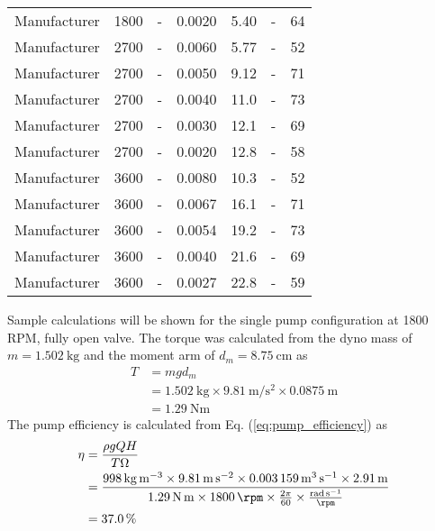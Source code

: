 \begin{longtable}{lC{0.10\textwidth}C{0.10\textwidth}C{0.10\textwidth}C{0.10\textwidth}C{0.10\textwidth}C{0.10\textwidth}}
    Manufacturer & 1800 & - & 0.0020 & 5.40 & - & 64 \\
    Manufacturer & 2700 & - & 0.0060 & 5.77 & - & 52 \\
    Manufacturer & 2700 & - & 0.0050 & 9.12 & - & 71 \\
    Manufacturer & 2700 & - & 0.0040 & 11.0 & - & 73 \\
    Manufacturer & 2700 & - & 0.0030 & 12.1 & - & 69 \\
    Manufacturer & 2700 & - & 0.0020 & 12.8 & - & 58 \\
    Manufacturer & 3600 & - & 0.0080 & 10.3 & - & 52 \\
    Manufacturer & 3600 & - & 0.0067 & 16.1 & - & 71 \\
    Manufacturer & 3600 & - & 0.0054 & 19.2 & - & 73 \\
    Manufacturer & 3600 & - & 0.0040 & 21.6 & - & 69 \\
    Manufacturer & 3600 & - & 0.0027 & 22.8 & - & 59 \\
    \bottomrule
\end{longtable}
\noindent Sample calculations will be shown for the single pump configuration at 1800 RPM, fully open valve. The torque was calculated from the dyno mass of $m = \qty{1.502}{\kilo\gram}$ and the moment arm of $d_m = \qty{8.75}{\centi\meter}$ as
\begin{align*}
    T &= m g d_m \\
    &= \qty{1.502}{\kilo\gram} \times \qty{9.81}{\meter\per\second\squared} \times \qty{0.0875}{\meter} \\
    &= \qty{1.29}{\newton\meter}
\end{align*}
The pump efficiency is calculated from Eq. (\ref{eq:pump_efficiency}) as
\begin{align*}
    \eta &= \frac{\rho g Q H}{T \Omega} \\
    &= \frac{\qty{998}{\kilo\gram\per\meter\cubed} \times \qty{9.81}{\meter\per\second\squared} \times \qty{0.003159}{\meter\cubed\per\second} \times \qty{2.91}{\meter}}{\qty{1.29}{\newton\meter} \times \qty{1800}{\rpm}\times \frac{2\pi}{60} \times \frac{\unit{\radian\per\second}}{\unit{\rpm}}} \\
    &= \qty{37.0}{\percent}
\end{align*}

